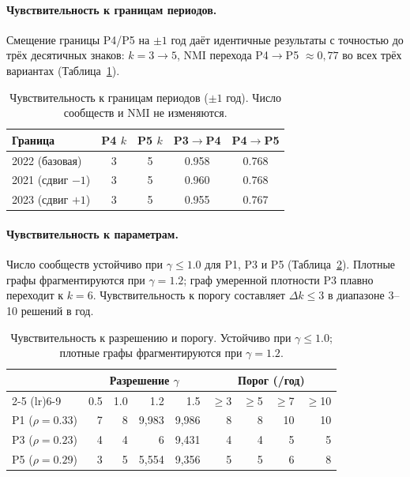 \documentclass[11pt]{article}
\begin{document}
\paragraph{Чувствительность к границам периодов.}
Смещение границы P4/P5 на $\pm 1$ год даёт идентичные результаты с точностью до трёх десятичных знаков: $k = 3 \to 5$, NMI перехода P4$\to$P5 $\approx 0{,}77$ во всех трёх вариантах (Таблица~\ref{tab:boundary}).

\begin{table}[t]
\centering
\small
\caption{Чувствительность к границам периодов ($\pm 1$ год). Число сообществ и NMI не изменяются.}
\label{tab:boundary}
\begin{tabular}{@{}lcccc@{}}
\toprule
\textbf{Граница} & \textbf{P4 $k$} & \textbf{P5 $k$} & \textbf{P3$\to$P4} & \textbf{P4$\to$P5} \\
\midrule
2022 (базовая) & 3 & 5 & 0.958 & 0.768 \\
2021 (сдвиг $-1$) & 3 & 5 & 0.960 & 0.768 \\
2023 (сдвиг $+1$) & 3 & 5 & 0.955 & 0.767 \\
\bottomrule
\end{tabular}
\end{table}

\paragraph{Чувствительность к параметрам.}
Число сообществ устойчиво при $\gamma \leq 1.0$ для P1, P3 и P5 (Таблица~\ref{tab:sensitivity}).
Плотные графы фрагментируются при $\gamma = 1.2$; граф умеренной плотности P3 плавно переходит к $k = 6$.
Чувствительность к порогу составляет $\Delta k \leq 3$ в диапазоне 3--10 решений в год.

\begin{table}[t]
\centering
\small
\caption{Чувствительность к разрешению и порогу. Устойчиво при $\gamma \leq 1.0$; плотные графы фрагментируются при $\gamma = 1.2$.}
\label{tab:sensitivity}
\begin{tabular}{@{}lrrrrrrrr@{}}
\toprule
& \multicolumn{4}{c}{\textbf{Разрешение $\gamma$}} & \multicolumn{4}{c}{\textbf{Порог (/год)}} \\
\cmidrule(lr){2-5} \cmidrule(lr){6-9}
& 0.5 & 1.0 & 1.2 & 1.5 & $\geq$3 & $\geq$5 & $\geq$7 & $\geq$10 \\
\midrule
P1 ($\rho{=}0.33$) & 7 & 8 & 9{,}983 & 9{,}986 & 8 & 8 & 10 & 10 \\
P3 ($\rho{=}0.23$) & 4 & 4 & 6 & 9{,}431 & 4 & 4 & 5 & 5 \\
P5 ($\rho{=}0.29$) & 3 & 5 & 5{,}554 & 9{,}356 & 5 & 5 & 6 & 8 \\
\bottomrule
\end{tabular}
\end{table}
\end{document}
